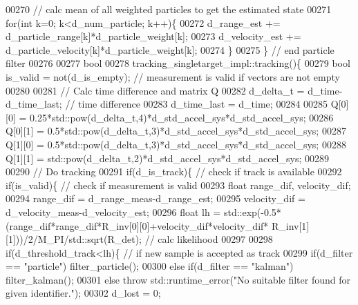 \begin{DoxyCode}
00270         \textcolor{comment}{// calc mean of all weighted particles to get the estimated state}
00271         \textcolor{keywordflow}{for}(\textcolor{keywordtype}{int} k=0; k<d_num_particle; k++)\{
00272             d_range_est += d_particle_range[k]*d_particle_weight[k];
00273             d_velocity_est += d_particle_velocity[k]*d\_particle\_weight[k];
00274         \}
00275     \} \textcolor{comment}{// end particle filter}
00276     
00277     \textcolor{keywordtype}{bool}
00278     tracking_singletarget_impl::tracking()\{ 
00279         \textcolor{keywordtype}{bool} is\_valid = not(d_is_empty); \textcolor{comment}{// measurement is valid if vectors are not empty}
00280             
00281         \textcolor{comment}{// Calc time difference and matrix Q}
00282         d_delta_t = d_time-d_time_last; \textcolor{comment}{// time difference}
00283         d\_time\_last = d_time;
00284         
00285         Q[0][0] = 0.25*std::pow(d_delta_t,4)*d_std_accel_sys*d_std_accel_sys;
00286         Q[0][1] = 0.5*std::pow(d_delta_t,3)*d\_std\_accel\_sys*d_std_accel_sys;
00287         Q[1][0] = 0.5*std::pow(d_delta_t,3)*d\_std\_accel\_sys*d_std_accel_sys;
00288         Q[1][1] = std::pow(d_delta_t,2)*d\_std\_accel\_sys*d_std_accel_sys;
00289         
00290         \textcolor{comment}{// Do tracking}
00291         \textcolor{keywordflow}{if}(d_is_track)\{ \textcolor{comment}{// check if track is available}
00292             \textcolor{keywordflow}{if}(is\_valid)\{ \textcolor{comment}{// check if measurement is valid}
00293                 \textcolor{keywordtype}{float} range\_dif, velocity\_dif;
00294                 range\_dif = d_range_meas-d_range_est;
00295                 velocity\_dif = d_velocity_meas-d_velocity_est;
00296                 \textcolor{keywordtype}{float} lh = std::exp(-0.5*(range\_dif*range\_dif*R_inv[0][0]+velocity\_dif*velocity\_dif*
      R_inv[1][1]))/2/M\_PI/std::sqrt(R_det); \textcolor{comment}{// calc likelihood}
00297                 
00298                 \textcolor{keywordflow}{if}(d_threshold_track<lh)\{ \textcolor{comment}{// if new sample is accepted as track}
00299                     \textcolor{keywordflow}{if}(d_filter == \textcolor{stringliteral}{"particle"}) filter_particle();
00300                     \textcolor{keywordflow}{else} \textcolor{keywordflow}{if}(d_filter == \textcolor{stringliteral}{"kalman"}) filter_kalman();
00301                     \textcolor{keywordflow}{else} \textcolor{keywordflow}{throw} std::runtime\_error(\textcolor{stringliteral}{"No suitable filter found for given identifier."});
00302                     d_lost = 0;

\end{DoxyCode}
